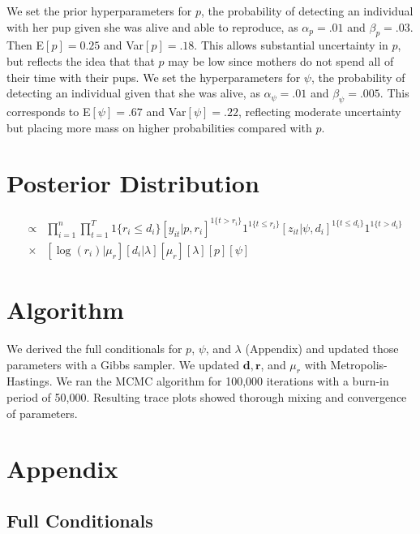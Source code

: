 \documentclass[12pt, a4paper]{article}
\begin{document}
We set the prior hyperparameters for $p$, the probability of detecting an individual with her pup given she was alive and able to reproduce, as $\alpha_p = .01$ and $\beta_p = .03$. Then E$[p] = 0.25$ and Var$[p] = .18$. This allows substantial uncertainty in $p$, but reflects the idea that that $p$ may be low since mothers do not spend all of their time with their pups. We set the hyperparameters for $\psi$, the probability of detecting an individual given that she was alive, as $\alpha_{\psi} = .01$ and $\beta_{\psi} = .005$. This corresponds to E$[\psi] = .67$ and Var$[\psi] = .22$, reflecting moderate uncertainty but placing more mass on higher probabilities compared with $p$. 

\section{Posterior Distribution}

\begin{eqnarray*}
[\log (\mathbf{r}), \mu_r, p, \mathbf{d}, \lambda, \psi | \mathbf{z}, \mathbf{y} ] & \propto & \prod_{i=1}^n \prod_{t=1} ^T  1\{r_i \leq d_i \} [y_{it}|p,r_i]^{1\{ t > r_i \}} 1^{1\{ t \leq r_i \}} [z_{it}|\psi, d_i]^{1 \{ t \leq d_i\} } 1^{1 \{ t > d_i\}} \\
  & \times & [\log(r_i)|\mu_r][d_i|\lambda]  [\mu_r][\lambda][p][\psi]
\end{eqnarray*}


\section{Algorithm}

We derived the full conditionals for $p$, $\psi$, and $\lambda$ (Appendix) and updated those parameters with a Gibbs sampler. We updated $\mathbf{d}, \mathbf{r}$, and $\mu_r$ with Metropolis-Hastings. We ran the MCMC algorithm for 100,000 iterations with a burn-in period of 50,000. Resulting trace plots showed thorough mixing and convergence of parameters. 

\section{Appendix}

\subsection{Full Conditionals} 
\end{document}
